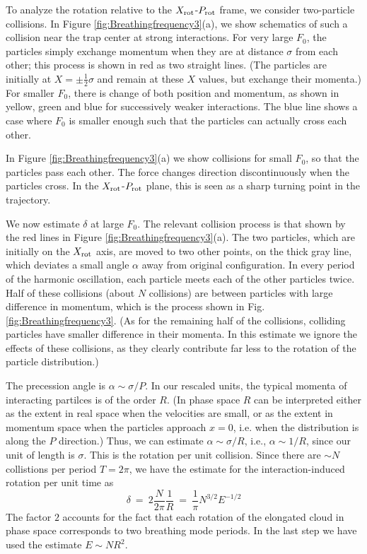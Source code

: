 \documentclass[onecolumn,pra]{revtex4-1}
\begin{document}



To analyze the rotation relative to the $X_{\rm rot}$-$P_{\rm rot}$ frame, we consider two-particle
collisions.  In Figure \ref{fig:Breathingfrequency3}(a), we show schematics of such a collision near
the trap center at strong interactions.  For very large $F_0$, the particles simply exchange momentum
when they are at distance $\sigma$ from each other; this process is shown in red as two straight
lines.  (The particles are initially at $X=\pm\frac{1}{2}\sigma$ and remain at these $X$ values,
but exchange their momenta.)   For smaller $F_0$, there is change of both position and momentum, as shown in yellow, green
and blue for successively weaker interactions. The blue line shows a case where $F_0$ is smaller
enough such that the particles can actually cross each other.

In Figure \ref{fig:Breathingfrequency3}(a) we show collisions for small $F_0$, so that the particles
pass each other.  The force changes direction discontinuously when the particles cross.  In the
$X_{\rm rot}$-$P_{\rm rot}$ plane, this is seen as a sharp turning point in the trajectory.

We now estimate $\delta$ at large $F_0$.  The relevant collision process is that shown by the red
lines in Figure \ref{fig:Breathingfrequency3}(a).  The two particles, which are initially on the
$X_{\rm rot}$ axis, are moved to two other points, on the thick gray line, which deviates a small
angle $\alpha$ away from original configuration.  In every period of the harmonic oscillation, each
particle meets each of the other particles twice.  Half of these collisions (about $N$ collisions)
are between particles with large difference in momentum, which is the process shown in
Fig.\ref{fig:Breathingfrequency3}.  (As for the remaining half of the collisions, colliding
particles have smaller difference in their momenta.  In this estimate we ignore the effects of these
collisions, as they clearly contribute far less to the rotation of the particle distribution.)

The precession angle is $\alpha\sim \sigma/P$.  In our rescaled units, the typical momenta of
interacting partilces is of the order $R$.  (In phase space $R$ can be interpreted either as the
extent in real space when the velocities are small, or as the extent in momentum space when the
particles approach $x=0$, i.e. when the distribution is along the $P$ direction.)  Thus, we can
estimate $\alpha\sim \sigma/R$, i.e., $\alpha\sim 1/R$, since our unit of length is $\sigma$.  This
is the rotation per unit collision.  Since there are $\sim N$ collistions per period $T=2\pi$, we
have the estimate for the interaction-induced rotation per unit time as
\begin{equation}
\delta ~=~ 2 \frac{N}{2\pi} \frac{1}{R} ~=~  \frac{1}{\pi}  N^{3/2}E^{-1/2}
\label{eq:breathingfrequency1}
\end{equation}
The factor $2$ accounts for the fact that each rotation of the elongated cloud in phase space
corresponds to two breathing mode periods.  In the last step we have used the estimate $E\sim
NR^2$. 
\end{document}
